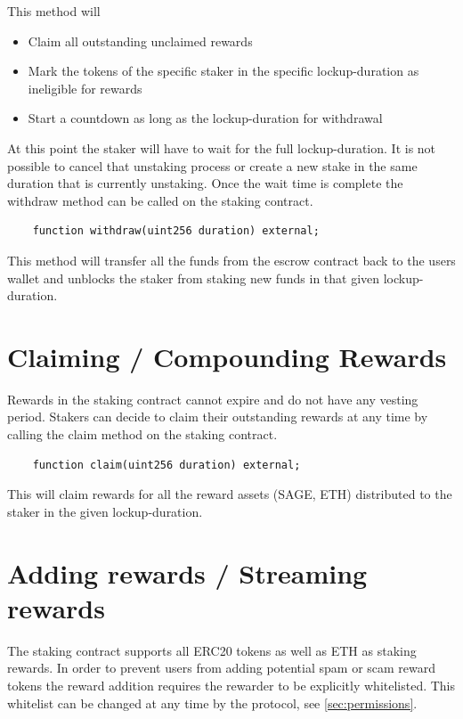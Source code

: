 \documentclass{article}
\begin{document}
This method will
\begin{itemize}
    \item Claim all outstanding unclaimed rewards
    \item Mark the tokens of the specific staker in the specific lockup-duration as ineligible for rewards
    \item Start a countdown as long as the lockup-duration for withdrawal
\end{itemize}

At this point the staker will have to wait for the full lockup-duration. 
It is not possible to cancel that unstaking process or create a new stake in the same duration that is currently unstaking.
Once the wait time is complete the withdraw method can be called on the staking contract.

\begin{verbatim}
    function withdraw(uint256 duration) external;
\end{verbatim}

This method will transfer all the funds from the escrow contract back to the users wallet
and unblocks the staker from staking new funds in that given lockup-duration.

\section{Claiming / Compounding Rewards}

Rewards in the staking contract cannot expire and do not have any vesting period.
Stakers can decide to claim their outstanding rewards at any time by calling the claim method on the staking contract.

\begin{verbatim}
    function claim(uint256 duration) external;
\end{verbatim}

This will claim rewards for all the reward assets (SAGE, ETH) distributed to the staker
in the given lockup-duration.

\section{Adding rewards / Streaming rewards}
The staking contract supports all ERC20 tokens as well as ETH as staking rewards.
In order to prevent users from adding potential spam or scam reward tokens the reward addition
requires the rewarder to be explicitly whitelisted. This whitelist can be changed at any time by the protocol, see \ref{sec:permissions}.
\end{document}

